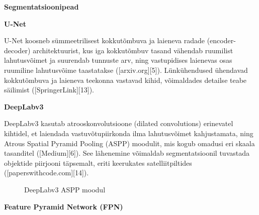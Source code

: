 \textbf{Segmentatsioonipead}

\textbf{U-Net}

U-Net koosneb sümmeetrilisest kokkutõmbuva ja laieneva radade (encoder-decoder) architektuurist, kus iga kokkutõmbuv tasand vähendab ruumilist lahutusvõimet ja suurendab tunnuste arv, ning vastupidises laienevas osas ruumiline lahutusvõime taastatakse ([arxiv.org][5]). Lünkühendused ühendavad kokkutõmbuva ja laieneva teekonna vastavad kihid, võimaldades detailse teabe säilimist ([SpringerLink][13]).



\textbf{DeepLabv3}

DeepLabv3 kasutab atrooskonvolutsioone (dilated convolutions) erinevatel kihtidel, et laiendada vastuvõtupiirkonda ilma lahutusvõimet kahjustamata, ning Atrous Spatial Pyramid Pooling (ASPP) moodulit, mis kogub omadusi eri skaala tasanditel ([Medium][6]). See lähenemine võimaldab segmentatsioonil tuvastada objektide piirjooni täpsemalt, eriti keerukates satelliitpiltides ([paperswithcode.com][14]).

\begin{figure}[!ht]
    \centering
    \caption{DeepLabv3 ASPP moodul}
    \label{fig:DeepLabv3ASPP}
\end{figure}


\textbf{Feature Pyramid Network (FPN)}

